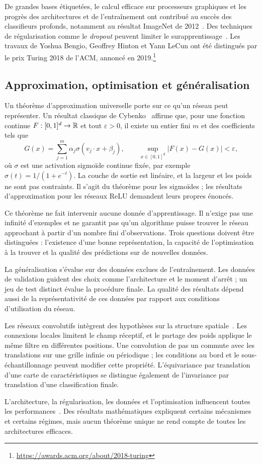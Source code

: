 De grandes bases étiquetées, le calcul efficace sur processeurs graphiques et les progrès des architectures et de l'entraînement ont contribué au succès des classifieurs profonds, notamment au résultat ImageNet de 2012~\cite{krizhevsky2012imagenet}. Des techniques de régularisation comme le \emph{dropout} peuvent limiter le surapprentissage~\cite{srivastava2014dropout}. Les travaux de Yoshua Bengio, Geoffrey Hinton et Yann LeCun ont été distingués par le prix Turing 2018 de l'ACM, annoncé en 2019.\footnote{\url{https://awards.acm.org/about/2018-turing}}

\subsection{Approximation, optimisation et généralisation}
Un théorème d'approximation universelle porte sur ce qu'un réseau peut représenter. Un résultat classique de Cybenko~\cite{cybenko1989approximation} affirme que, pour une fonction continue $F:[0,1]^d\to\mathbb{R}$ et tout $\varepsilon>0$, il existe un entier fini $m$ et des coefficients tels que
\[
 G(x)=\sum_{j=1}^m\alpha_j\sigma(v_j\cdot x+\beta_j),
 \qquad \sup_{x\in[0,1]^d}|F(x)-G(x)|<\varepsilon,
\]
où $\sigma$ est une activation sigmoïde continue fixée, par exemple $\sigma(t)=1/(1+e^{-t})$. La couche de sortie est linéaire, et la largeur et les poids ne sont pas contraints. Il s'agit du théorème pour les sigmoïdes ; les résultats d'approximation pour les réseaux ReLU demandent leurs propres énoncés.

Ce théorème ne fait intervenir aucune donnée d'apprentissage. Il n'exige pas une infinité d'exemples et ne garantit pas qu'un algorithme puisse trouver le réseau approchant à partir d'un nombre fini d'observations. Trois questions doivent être distinguées : l'existence d'une bonne représentation, la capacité de l'optimisation à la trouver et la qualité des prédictions sur de nouvelles données.

La généralisation s'évalue sur des données exclues de l'entraînement. Les données de validation guident des choix comme l'architecture et le moment d'arrêt ; un jeu de test distinct évalue la procédure finale. La qualité des résultats dépend aussi de la représentativité de ces données par rapport aux conditions d'utilisation du réseau.

Les réseaux convolutifs intègrent des hypothèses sur la structure spatiale~\cite{lecun1998gradient}. Les connexions locales limitent le champ réceptif, et le partage des poids applique le même filtre en différentes positions. Une convolution de pas un commute avec les translations sur une grille infinie ou périodique ; les conditions au bord et le sous-échantillonnage peuvent modifier cette propriété. L'équivariance par translation d'une carte de caractéristiques se distingue également de l'invariance par translation d'une classification finale.

L'architecture, la régularisation, les données et l'optimisation influencent toutes les performances~\cite{lecun2015deep}. Des résultats mathématiques expliquent certains mécanismes et certains régimes, mais aucun théorème unique ne rend compte de toutes les architectures efficaces.
